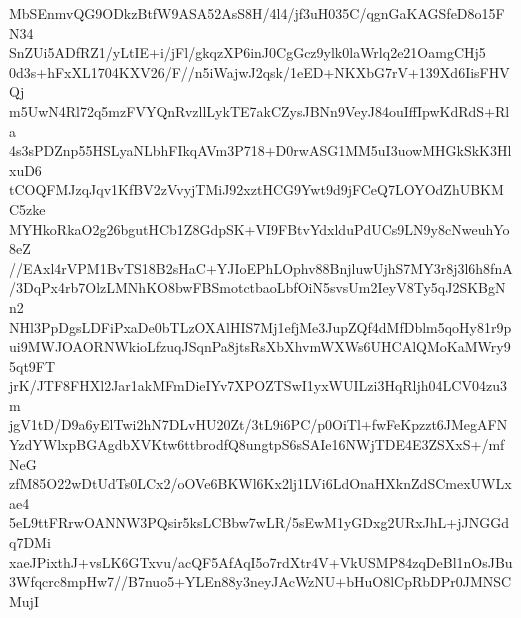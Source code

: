 MbSEnmvQG9ODkzBtfW9ASA52AsS8H/4l4/jf3uH035C/qgnGaKAGSfeD8o15FN34
SnZUi5ADfRZ1/yLtIE+i/jFl/gkqzXP6inJ0CgGcz9ylk0laWrlq2e21OamgCHj5
0d3s+hFxXL1704KXV26/F//n5iWajwJ2qsk/1eED+NKXbG7rV+139Xd6IisFHVQj
m5UwN4Rl72q5mzFVYQnRvzllLykTE7akCZysJBNn9VeyJ84ouIffIpwKdRdS+Rla
4s3sPDZnp55HSLyaNLbhFIkqAVm3P718+D0rwASG1MM5uI3uowMHGkSkK3HlxuD6
tCOQFMJzqJqv1KfBV2zVvyjTMiJ92xztHCG9Ywt9d9jFCeQ7LOYOdZhUBKMC5zke
MYHkoRkaO2g26bgutHCb1Z8GdpSK+VI9FBtvYdxlduPdUCs9LN9y8cNweuhYo8eZ
//EAxl4rVPM1BvTS18B2sHaC+YJIoEPhLOphv88BnjluwUjhS7MY3r8j3l6h8fnA
/3DqPx4rb7OlzLMNhKO8bwFBSmotctbaoLbfOiN5svsUm2IeyV8Ty5qJ2SKBgNn2
NHl3PpDgsLDFiPxaDe0bTLzOXAlHIS7Mj1efjMe3JupZQf4dMfDblm5qoHy81r9p
ui9MWJOAORNWkioLfzuqJSqnPa8jtsRsXbXhvmWXWs6UHCAlQMoKaMWry95qt9FT
jrK/JTF8FHXl2Jar1akMFmDieIYv7XPOZTSwI1yxWUILzi3HqRljh04LCV04zu3m
jgV1tD/D9a6yElTwi2hN7DLvHU20Zt/3tL9i6PC/p0OiTl+fwFeKpzzt6JMegAFN
YzdYWlxpBGAgdbXVKtw6ttbrodfQ8ungtpS6sSAIe16NWjTDE4E3ZSXxS+/mfNeG
zfM85O22wDtUdTs0LCx2/oOVe6BKWl6Kx2lj1LVi6LdOnaHXknZdSCmexUWLxae4
5eL9ttFRrwOANNW3PQsir5ksLCBbw7wLR/5sEwM1yGDxg2URxJhL+jJNGGdq7DMi
xaeJPixthJ+vsLK6GTxvu/acQF5AfAqI5o7rdXtr4V+VkUSMP84zqDeBl1nOsJBu
3Wfqcrc8mpHw7//B7nuo5+YLEn88y3neyJAcWzNU+bHuO8lCpRbDPr0JMNSCMujI
